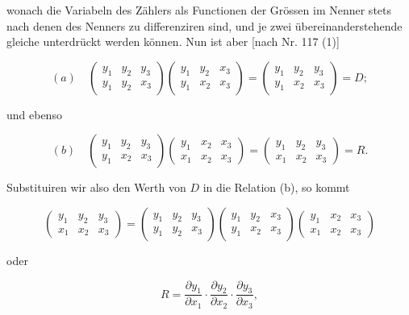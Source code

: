 \documentclass[11pt]{article}
\providecommand{\weq}[2]{\begin{equation}\tag{#1}#2\end{equation}}
\begin{document}
wonach die Variabeln des Zählers als Functionen der Grössen im
Nenner stets nach denen des Nenners zu differenziren sind, und je zwei
übereinanderstehende gleiche unterdrückt werden können. Nun ist
aber [nach Nr. 117 (1)]

\[
(a) \quad \begin{pmatrix} y_1 & y_2 & y_3 \\ y_1 & y_2 & x_3 \end{pmatrix} \begin{pmatrix} y_1 & y_2 & x_3 \\ y_1 & x_2 & x_3 \end{pmatrix} = \begin{pmatrix} y_1 & y_2 & y_3 \\ y_1 & x_2 & x_3 \end{pmatrix} = D;
\]

und ebenso

\[
(b) \quad \begin{pmatrix} y_1 & y_2 & y_3 \\ y_1 & x_2 & x_3 \end{pmatrix} \begin{pmatrix} y_1 & x_2 & x_3 \\ x_1 & x_2 & x_3 \end{pmatrix} = \begin{pmatrix} y_1 & y_2 & y_3 \\ x_1 & x_2 & x_3 \end{pmatrix} = R.
\]

Substituiren wir also den Werth von $D$ in die Relation (b), so kommt

\weq{3}{
\begin{pmatrix} y_1 & y_2 & y_3 \\ x_1 & x_2 & x_3 \end{pmatrix}
=
\begin{pmatrix} y_1 & y_2 & y_3 \\ y_1 & y_2 & x_3 \end{pmatrix}
\begin{pmatrix} y_1 & y_2 & x_3 \\ y_1 & x_2 & x_3 \end{pmatrix}
\begin{pmatrix} y_1 & x_2 & x_3 \\ x_1 & x_2 & x_3 \end{pmatrix}
}

oder

\[
R = \dfrac{\partial y_1}{\partial x_1} \cdot \dfrac{\partial y_2}{\partial x_2} \cdot \dfrac{\partial y_3}{\partial x_3}, \tag{II}
\]
\end{document}
